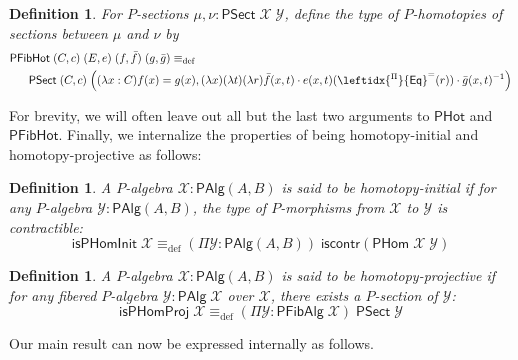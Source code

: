 \documentclass[10pt,a4paper,oneside,reqno]{amsart}
\numberwithin{equation}{section}
\theoremstyle{mythm}
\theoremstyle{mydef}
\newtheorem{definition}[theorem]{Definition}
\theoremstyle{myrmk}
\newcommand{\deq}{\equiv}
\newcommand{\defeq}{\deq_{\mathrm{def}}}
\newcommand{\iscontr}{\mathsf{iscontr}}
\newcommand{\ct}{\cdot}
\newcommand{\funext}{\leftidx{^\Pi}{\mathsf{Eq}}^{=}}
\newcommand{\WCell}{\mathsf{PHot}}
\newcommand{\WFibCell}{\mathsf{PFibHot}}
\newcommand{\WAlg}{\mathsf{PAlg}}
\newcommand{\WFibAlg}{\mathsf{PFibAlg}}
\newcommand{\WHom}{\mathsf{PHom}}
\newcommand{\WFibHom}{\mathsf{PSect}}
\newcommand{\IsWHInit}{\mathsf{isPHomInit}}
\newcommand{\IsWHProj}{\mathsf{isPHomProj}}
\newcommand{\X}{\mathcal{X}}
\newcommand{\Y}{\mathcal{Y}}
\begin{document}
\begin{definition}\label{def:WFibCell}
For $P$-sections $\mu, \nu : \WFibHom \; \X \; \Y$, define the type of \emph{$P$-homotopies of sections} between $\mu$ and $\nu$ by
\begin{align*}
& \WFibCell \; (C,c) \; (E, e) \; (f,\bar{f}) \; (g,\bar{g}) \defeq \\ & \;\;\; \;\;\;\WFibHom \; (C,c) \; \Big((\lambda x:C) f(x) = g(x), (\lambda x) (\lambda t) (\lambda r) \bar{f}(x,t) \ct e(x,t)(\funext(r)) \ct \bar{g}(x,t)^{-1}\Big)
\end{align*}
\end{definition}

For brevity, we will often leave out all but the last two arguments to $\WCell$ and $\WFibCell$. Finally, we internalize the properties of being homotopy-initial and homotopy-projective as follows:

\begin{definition}\label{def:WHInit}
A $P$-algebra $\X : \WAlg(A,B)$ is said to be \emph{homotopy-initial} if for any $P$-algebra $\Y : \WAlg(A,B)$, the type of $P$-morphisms from $\X$ to $\Y$ is contractible:
\[ \IsWHInit \; \X \defeq (\Pi \Y:\WAlg(A,B)) \; \iscontr(\WHom \; \X \; \Y) \]  
\end{definition}

\begin{definition}\label{def:WHProj}
A $P$-algebra $\X : \WAlg(A,B)$ is said to be \emph{homotopy-projective} if for any fibered $P$-algebra $\Y : \WAlg \; \X$ over $\X$, there exists a $P$-section of $\Y$:
\[ \IsWHProj \; \X \defeq (\Pi \Y:\WFibAlg \; \X) \; \WFibHom \; \Y \]  
\end{definition}

Our main result can now be expressed internally as follows.
\end{document}
